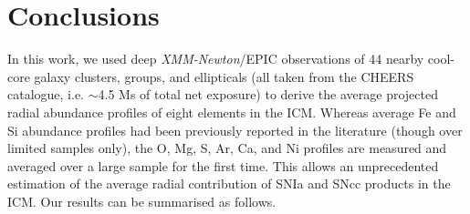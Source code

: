 \documentclass{aa}
\begin{document}

\section{Conclusions}\label{sect:conclusion}



In this work, we used deep \textit{XMM-Newton}/EPIC observations of 44 nearby cool-core galaxy clusters, groups, and ellipticals (all taken from the CHEERS catalogue, i.e. $\sim$4.5 Ms of total net exposure) to derive the average projected radial abundance profiles of eight elements in the ICM. Whereas average Fe and Si abundance profiles had been previously reported in the literature (though over limited samples only), the O, Mg, S, Ar, Ca, and Ni profiles are measured and averaged over a large sample for the first time. This allows an unprecedented estimation of the average radial contribution of SNIa and SNcc products in the ICM. Our results can be summarised as follows.
\end{document}
